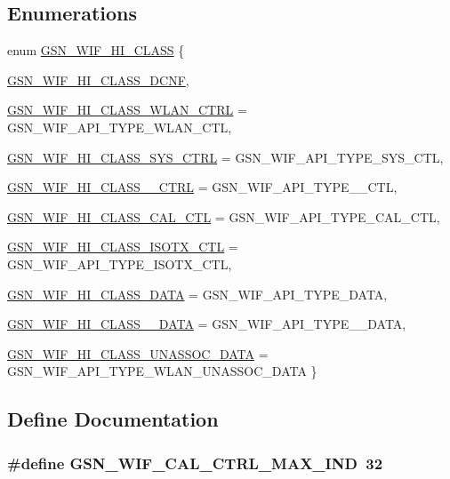 \subsection*{Enumerations}
\begin{DoxyCompactItemize}
\item 
enum \hyperlink{a00608_ad57dfb23fbead4a670f7e5b7de94019a}{GSN\_\-WIF\_\-HI\_\-CLASS} \{ \par
\hyperlink{a00608_ad57dfb23fbead4a670f7e5b7de94019aae239d4932852e8c7eaa8e243065118e6}{GSN\_\-WIF\_\-HI\_\-CLASS\_\-DCNF}, 
\par
\hyperlink{a00608_ad57dfb23fbead4a670f7e5b7de94019aad82ae5066d4b45c308102d24f57b7947}{GSN\_\-WIF\_\-HI\_\-CLASS\_\-WLAN\_\-CTRL} =  GSN\_\-WIF\_\-API\_\-TYPE\_\-WLAN\_\-CTL, 
\par
\hyperlink{a00608_ad57dfb23fbead4a670f7e5b7de94019aacef9de22ec2173bde8f664efd7eba97a}{GSN\_\-WIF\_\-HI\_\-CLASS\_\-SYS\_\-CTRL} =  GSN\_\-WIF\_\-API\_\-TYPE\_\-SYS\_\-CTL, 
\par
\hyperlink{a00608_ad57dfb23fbead4a670f7e5b7de94019aaff19fa086edd3147f9213b000c831a0c}{GSN\_\-WIF\_\-HI\_\-CLASS\_\_\-CTRL} =  GSN\_\-WIF\_\-API\_\-TYPE\_\_\-CTL, 
\par
\hyperlink{a00608_ad57dfb23fbead4a670f7e5b7de94019aa2e660abc5f793a1b577c86186934c78a}{GSN\_\-WIF\_\-HI\_\-CLASS\_\-CAL\_\-CTL} =  GSN\_\-WIF\_\-API\_\-TYPE\_\-CAL\_\-CTL, 
\par
\hyperlink{a00608_ad57dfb23fbead4a670f7e5b7de94019aaf903e3fa751d4edb0e2854face4172e3}{GSN\_\-WIF\_\-HI\_\-CLASS\_\-ISOTX\_\-CTL} =  GSN\_\-WIF\_\-API\_\-TYPE\_\-ISOTX\_\-CTL, 
\par
\hyperlink{a00608_ad57dfb23fbead4a670f7e5b7de94019aa5ecbc325cdfd76f9e490bc3def8777cd}{GSN\_\-WIF\_\-HI\_\-CLASS\_\-DATA} =  GSN\_\-WIF\_\-API\_\-TYPE\_\-DATA, 
\par
\hyperlink{a00608_ad57dfb23fbead4a670f7e5b7de94019aa3e29aec70f494653c3d2623dd254e780}{GSN\_\-WIF\_\-HI\_\-CLASS\_\_\-DATA} =  GSN\_\-WIF\_\-API\_\-TYPE\_\_\-DATA, 
\par
\hyperlink{a00608_ad57dfb23fbead4a670f7e5b7de94019aa55bda601e5518d2c56ec69e3e2f71701}{GSN\_\-WIF\_\-HI\_\-CLASS\_\-UNASSOC\_\-DATA} =  GSN\_\-WIF\_\-API\_\-TYPE\_\-WLAN\_\-UNASSOC\_\-DATA
 \}
\end{DoxyCompactItemize}


\subsection{Define Documentation}
\hypertarget{a00608_a07a5b5cf683f42ec8377572f71520ecb}{
\subsubsection[{GSN\_\-WIF\_\-CAL\_\-CTRL\_\-MAX\_\-IND}]{\setlength{\rightskip}{0pt plus 5cm}\#define GSN\_\-WIF\_\-CAL\_\-CTRL\_\-MAX\_\-IND~32}}
\label{a00608_a07a5b5cf683f42ec8377572f71520ecb}


